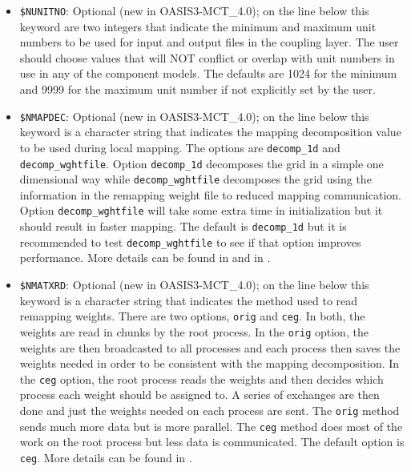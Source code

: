 \begin{itemize}
\item {\tt \$NUNITNO}: Optional (new in OASIS3-MCT\_4.0); on the line below this keyword are two integers
  that indicate the minimum and maximum unit numbers to be used for
  input and output files in the coupling layer.  The user should
  choose values that will NOT conflict or overlap with unit numbers in
  use in any of the component models. The defaults are 1024 for the minimum and 9999
  for the maximum unit number if not explicitly set by the user.

\item {\tt \$NMAPDEC}: Optional (new in OASIS3-MCT\_4.0); on the line below this keyword is a character string
  that indicates the mapping decomposition value to be used during local mapping.  The
  options are {\tt decomp\_1d} and {\tt decomp\_wghtfile}.  Option {\tt decomp\_1d} decomposes the grid in a simple
  one dimensional way while {\tt decomp\_wghtfile} decomposes the grid using the
  information in the remapping weight file to reduced mapping communication. Option {\tt decomp\_wghtfile}
  will take some extra time in initialization but it should result in faster mapping.
  The default is {\tt decomp\_1d} but it is recommended to test {\tt decomp\_wghtfile} to see if that
  option improves performance. More details can be found in \cite {craig18} and in \cite{valcke11}.

\item {\tt \$NMATXRD}: Optional (new in OASIS3-MCT\_4.0); on the line below this keyword is a character string
  that indicates the method used to read remapping weights.  There are two options, {\tt orig}
  and {\tt ceg}.  In both, the weights are read in chunks by the root process.  In the {\tt orig} option,
  the weights are then broadcasted to all processes and each process then saves the weights needed in
  order to be consistent with the mapping decomposition.  In the {\tt ceg} option, the root process
  reads the weights and then decides which process each weight should be assigned to.  A
  series of exchanges are then done and just the weights needed on
  each process are sent.  The {\tt orig} method sends much more data but is more parallel.  The {\tt ceg}
  method does most of the work on the root process but less data is communicated.  The default option
  is {\tt ceg}. More details can be found in \cite {craig18}.


\end{itemize}

